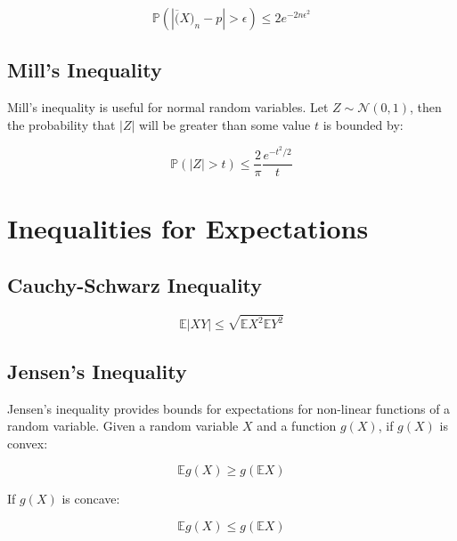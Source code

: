 \begin{equation}
\mathbb{P}(|\overline(X)_n - p| > \epsilon) \leq 2e^{-2n\epsilon^2}
\end{equation}

\subsection{Mill's Inequality}
Mill's inequality is useful for normal random variables. Let $Z \sim \mathscr{N}(0,1)$, then the probability that $|Z|$ will be greater than some value $t$ is bounded by: 

\begin{equation}
\mathbb{P}(|Z|>t) \leq \frac{2}{\pi}\frac{e^{-t^2/2}}{t}
\end{equation}


\section{Inequalities for Expectations}

\subsection{Cauchy-Schwarz Inequality}

\begin{equation}
\mathbb{E}|XY|\leq \sqrt{\mathbb{E}X^2 \mathbb{E}Y^2}
\end{equation}



\subsection{Jensen's Inequality}

Jensen's inequality provides bounds for expectations for non-linear functions of a random variable. Given a random variable $X$ and a function $g(X)$, if $g(X)$ is convex:

\begin{equation}
\mathbb{E}g(X) \geq g(\mathbb{E}X)
\end{equation}

If $g(X)$ is concave:

\begin{equation}
\mathbb{E}g(X) \leq g(\mathbb{E}X)
\end{equation}



